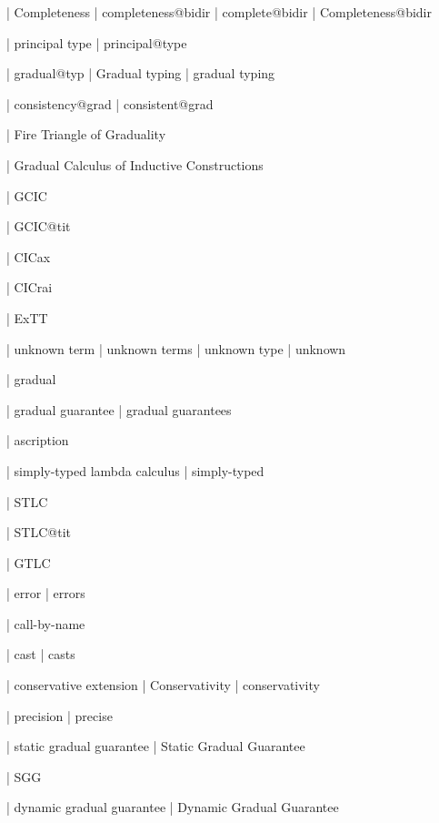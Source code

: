   | Completeness
  | completeness@bidir
  | complete@bidir
  | Completeness@bidir


  | principal type
  | principal@type



  | gradual@typ
  | Gradual typing
  | gradual typing

  | consistency@grad
  | consistent@grad

  | Fire Triangle of Graduality

  | Gradual Calculus of Inductive Constructions

  | GCIC

  | GCIC@tit


  | CICax

  | CICrai

  | ExTT

  | unknown term
  | unknown terms
  | unknown type
  | unknown

  | gradual

  | gradual guarantee
  | gradual guarantees

  | ascription

  | simply-typed lambda calculus
  | simply-typed

  | STLC

  | STLC@tit

  | GTLC

  | error
  | errors

  | call-by-name

  | cast
  | casts

  | conservative extension
  | Conservativity
  | conservativity

  | precision
  | precise

  | static gradual guarantee
  | Static Gradual Guarantee

  | SGG

  | dynamic gradual guarantee
  | Dynamic Gradual Guarantee

